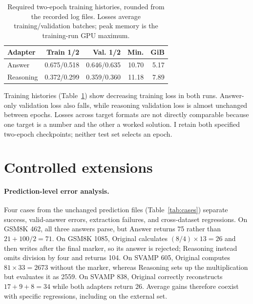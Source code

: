 \documentclass[11pt]{article}
\begin{document}
\begin{table}[t]
\centering
\scriptsize
\setlength{\tabcolsep}{3pt}
\begin{tabular}{@{}lrrrr@{}}
\toprule
Adapter & Train 1/2 & Val. 1/2 & Min. & GiB \\
\midrule
Answer & 0.675/0.518 & 0.646/0.635 & 10.70 & 5.17 \\
Reasoning & 0.372/0.299 & 0.359/0.360 & 11.18 & 7.89 \\
\bottomrule
\end{tabular}
\caption{Required two-epoch training histories, rounded from the recorded log files. Losses average training/validation batches; peak memory is the training-run GPU maximum.}
\label{tab:training}
\end{table}

Training histories (Table~\ref{tab:training}) show decreasing training loss in both runs. Answer-only validation loss also falls, while reasoning validation loss is almost unchanged between epochs. Losses across target formats are not directly comparable because one target is a number and the other a worked solution. I retain both specified two-epoch checkpoints; neither test set selects an epoch.

\section{Controlled extensions}
\paragraph{Prediction-level error analysis.} Four cases from the unchanged prediction files (Table~\ref{tab:cases}) separate success, valid-answer errors, extraction failures, and cross-dataset regressions. On GSM8K 462, all three answers parse, but Answer returns 75 rather than $21+100/2=71$. On GSM8K 1085, Original calculates $(8/4)\times13=26$ and then writes after the final marker, so its answer is rejected; Reasoning instead omits division by four and returns 104. On SVAMP 605, Original computes $81\times33=2673$ without the marker, whereas Reasoning sets up the multiplication but evaluates it as 2559. On SVAMP 838, Original correctly reconstructs $17+9+8=34$ while both adapters return 26. Average gains therefore coexist with specific regressions, including on the external set.
\end{document}
